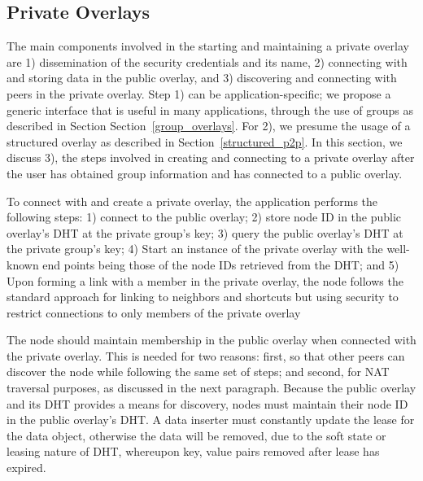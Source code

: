 \documentclass[conference]{IEEEtran}
\begin{document}
\subsection{Private Overlays}
The main components involved in the starting and maintaining a private overlay
are 1) dissemination of the security credentials and its name, 2) connecting
with and storing data in the public overlay, and 3) discovering and connecting
with peers in the private overlay.  Step 1) can be application-specific; we
propose a generic interface that is useful in many applications, through the use of groups as described in Section
Section~\ref{group_overlays}.  For 2), we presume the usage of a structured
overlay as described in Section~\ref{structured_p2p}.  In this section, we
discuss 3), the steps involved in creating and connecting to a private overlay
after the user has obtained group information and has connected to a public
overlay.

To connect with and create a private overlay, the application performs the
following steps: 1) connect to the public overlay; 2) store node ID in the
public overlay's DHT at the private group's key; 3) query the public overlay's
DHT at the private group's key; 4) Start an instance of the private overlay with
the well-known end points being those of the node IDs retrieved from the DHT;
and 5) Upon forming a link with a member in the private overlay, the node follows
the standard approach for linking to neighbors and shortcuts but using security
to restrict connections to only members of the private overlay

The node should maintain membership in the public overlay when connected with
the private overlay.  This is needed for two reasons: first, so that other peers can discover the
node while following the same set of steps; and second, for NAT traversal purposes, as
discussed in the next paragraph.  Because the public overlay and its DHT
provides a means for discovery, nodes must maintain their node ID in the public
overlay's DHT.  A data inserter must constantly update the lease for the data
object, otherwise the data will be removed, due to the soft state or leasing
nature of DHT, whereupon key, value pairs removed after lease has expired.
\end{document}
